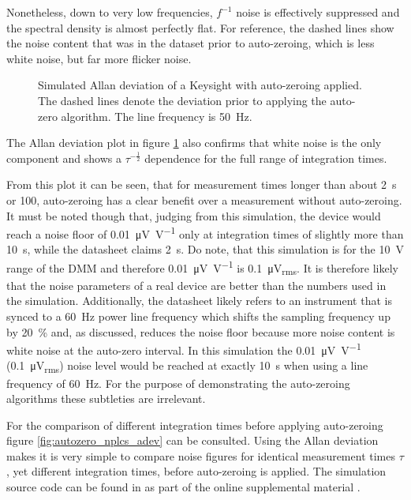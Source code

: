 Nonetheless, down to very low frequencies, $f^{-1}$ noise is effectively suppressed and the spectral density is almost perfectly flat. For reference, the dashed lines show the noise content that was in the dataset prior to auto-zeroing, which is less white noise, but far more flicker noise.

\begin{figure}[hb]
    \centering
    
    \caption{Simulated Allan deviation of a Keysight  with auto-zeroing applied. The dashed lines denote the deviation prior to applying the auto-zero algorithm. The line frequency is \qty{50}{\Hz}.}
    \label{fig:autozero_adev}
\end{figure}

The Allan deviation plot in figure \ref{fig:autozero_adev} also confirms that white noise is the only component and shows a $\tau^{-\frac 1 2}$ dependence for the full range of integration times.

From this plot it can be seen, that for measurement times longer than about \qty{2}{\s} or \qty{100}{\plc}, auto-zeroing has a clear benefit over a measurement without auto-zeroing. It must be noted though that, judging from this simulation, the device would reach a noise floor of \qty[per-mode = symbol]{0.01}{\uV \per \V} only at integration times of slightly more than \qty{10}{\s}, while the datasheet claims \qty{2}{\s}. Do note, that this simulation is for the \qty{10}{\V} range of the DMM and therefore \qty[per-mode = symbol]{0.01}{\uV \per \V} is \qty{0.1}{\uV_{rms}}. It is therefore likely that the noise parameters of a real device are better than the numbers used in the simulation. Additionally, the datasheet likely refers to an instrument that is synced to a \qty{60}{\Hz} power line frequency which shifts the sampling frequency up by \qty{20}{\percent} and, as discussed, reduces the noise floor because more noise content is white noise at the auto-zero interval. In this simulation the \qty{0.01}{\uV \per \V} (\qty{0.1}{\uV_{rms}}) noise level would be reached at exactly \qty{10}{\s} when using a line frequency of \qty{60}{\Hz}. For the purpose of demonstrating the auto-zeroing algorithms these subtleties are irrelevant.

For the comparison of different integration times before applying auto-zeroing figure \ref{fig:autozero_nplcs_adev} can be consulted. Using the Allan deviation makes it is very simple to compare noise figures for identical measurement times $\tau$, yet different integration times, before auto-zeroing is applied. The simulation source code can be found in  as part of the online supplemental material \cite{supplemental_material}.

